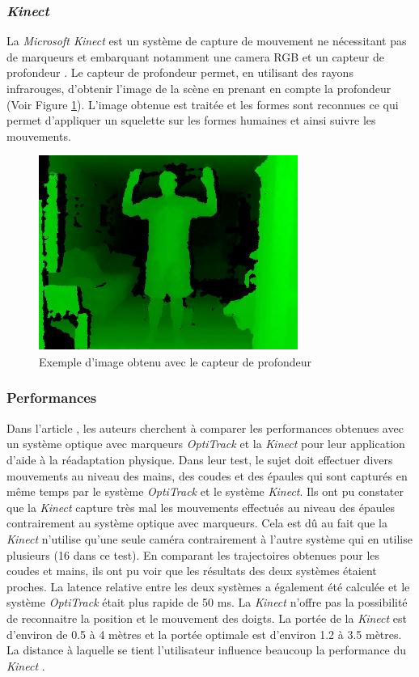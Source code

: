 \subsubsection{\emph{Kinect}}
La \emph{Microsoft Kinect} est un système de capture de mouvement ne nécessitant pas de marqueurs et embarquant notamment une camera RGB et un capteur de profondeur \cite{ze12}. Le capteur de profondeur permet, en utilisant des rayons infrarouges, d'obtenir l'image de la scène en prenant en compte la profondeur (Voir Figure \ref{fig6}). L'image obtenue est traitée et les formes sont reconnues ce qui permet d'appliquer un squelette sur les formes humaines et ainsi suivre les mouvements.
\begin{figure}[!h]
   	\centerline{\includegraphics[scale=1.0]{./depthsensor}}
   	\caption{\label{fig6} Exemple d'image obtenu avec le capteur de profondeur}
\end{figure}
\subsubsection{Performances}
Dans l'article \cite{ch12}, les auteurs cherchent à comparer les performances obtenues avec un système optique avec marqueurs \emph{OptiTrack} et la \emph{Kinect} pour leur application d'aide à la réadaptation physique. Dans leur test, le sujet doit effectuer divers mouvements au niveau des mains, des coudes et des épaules qui sont capturés en même temps par le système \emph{OptiTrack} et le système \emph{Kinect}. Ils ont pu constater que la \emph{Kinect} capture très mal les mouvements effectués au niveau des épaules contrairement au système optique avec marqueurs. Cela est dû au fait que la \emph{Kinect} n'utilise qu'une seule caméra contrairement à l'autre système qui en utilise plusieurs (16 dans ce test). En comparant les trajectoires obtenues pour les coudes et mains, ils ont pu voir que les résultats des deux systèmes étaient proches. La latence relative entre les deux systèmes a également été calculée et le système \emph{OptiTrack} était plus rapide de 50 ms. La \emph{Kinect} n'offre pas la possibilité de reconnaitre la position et le mouvement des doigts. La portée de la \emph{Kinect} est d'environ de 0.5 à 4 mètres et la portée optimale est d'environ 1.2 à 3.5 mètres. La distance à laquelle se tient l'utilisateur influence beaucoup la performance du \emph{Kinect} \cite{li12}.

